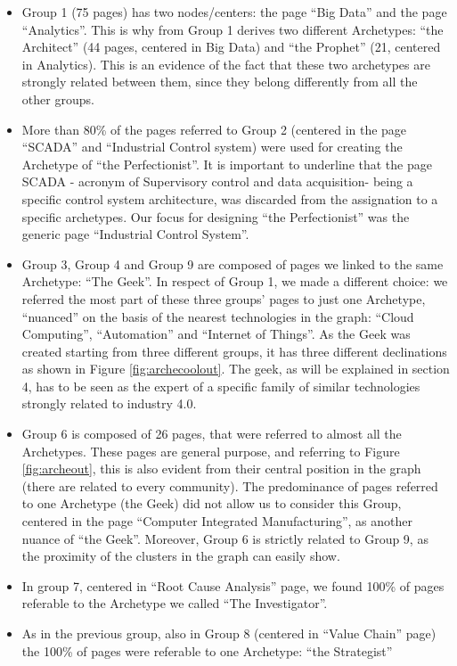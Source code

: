 \documentclass[]{book}
\theoremstyle{definition}
\theoremstyle{definition}
\theoremstyle{definition}
\theoremstyle{remark}
\begin{document}
\begin{itemize}
\item
  Group 1 (75 pages) has two nodes/centers: the page ``Big Data'' and
  the page ``Analytics''. This is why from Group 1 derives two different
  Archetypes: ``the Architect'' (44 pages, centered in Big Data) and
  ``the Prophet'' (21, centered in Analytics). This is an evidence of
  the fact that these two archetypes are strongly related between them,
  since they belong differently from all the other groups.
\item
  More than 80\% of the pages referred to Group 2 (centered in the page
  ``SCADA'' and ``Industrial Control system) were used for creating the
  Archetype of ``the Perfectionist''. It is important to underline that
  the page SCADA - acronym of Supervisory control and data acquisition-
  being a specific control system architecture, was discarded from the
  assignation to a specific archetypes. Our focus for designing ``the
  Perfectionist'' was the generic page ``Industrial Control System''.
\item
  Group 3, Group 4 and Group 9 are composed of pages we linked to the
  same Archetype: ``The Geek''. In respect of Group 1, we made a
  different choice: we referred the most part of these three groups'
  pages to just one Archetype, ``nuanced'' on the basis of the nearest
  technologies in the graph: ``Cloud Computing'', ``Automation'' and
  ``Internet of Things''. As the Geek was created starting from three
  different groups, it has three different declinations as shown in
  Figure \ref{fig:archecoolout}. The geek, as will be explained in
  section 4, has to be seen as the expert of a specific family of
  similar technologies strongly related to industry 4.0.
\item
  Group 6 is composed of 26 pages, that were referred to almost all the
  Archetypes. These pages are general purpose, and referring to Figure
  \ref{fig:archeout}, this is also evident from their central position
  in the graph (there are related to every community). The predominance
  of pages referred to one Archetype (the Geek) did not allow us to
  consider this Group, centered in the page ``Computer Integrated
  Manufacturing'', as another nuance of ``the Geek''. Moreover, Group 6
  is strictly related to Group 9, as the proximity of the clusters in
  the graph can easily show.
\item
  In group 7, centered in ``Root Cause Analysis'' page, we found 100\%
  of pages referable to the Archetype we called ``The Investigator''.
\item
  As in the previous group, also in Group 8 (centered in ``Value Chain''
  page) the 100\% of pages were referable to one Archetype: ``the
  Strategist''
\end{itemize}
\end{document}
